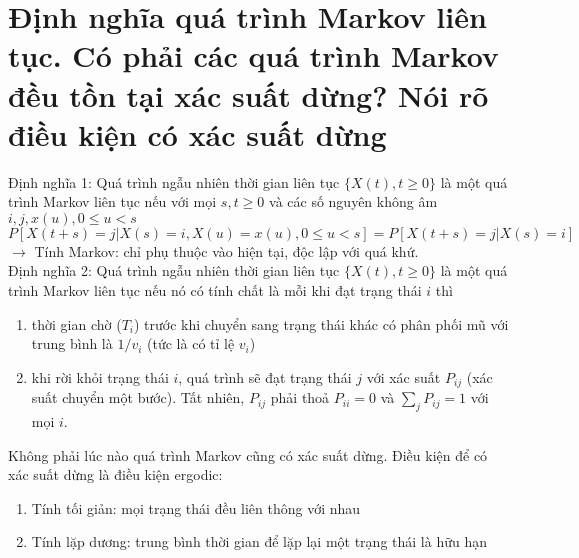 \documentclass{article}
\begin{document}
\section{Định nghĩa quá trình Markov liên tục. Có phải các quá trình Markov đều tồn tại xác suất dừng? Nói rõ điều kiện có xác suất dừng}
Định nghĩa 1: Quá trình ngẫu nhiên thời gian liên tục $\{X(t), t \geq 0\}$ là một quá trình Markov liên tục nếu với mọi $s, t \geq 0$ và các số nguyên không âm $i, j, x(u), 0 \leq u < s$
\[
P[X(t + s) = j | X(s) = i, X(u) = x(u), 0 \leq u < s] = P[X(t + s) = j | X(s) = i]
\]
$\rightarrow$ Tính Markov: chỉ phụ thuộc vào hiện tại, độc lập với quá khứ.\\
Định nghĩa 2: Quá trình ngẫu nhiên thời gian liên tục $\{X(t), t \geq 0\}$ là một quá trình Markov liên tục nếu nó có tính chất là mỗi khi đạt trạng thái $i$ thì
\begin{enumerate}
    \item thời gian chờ ($T_i$) trước khi chuyển sang trạng thái khác có phân phối mũ với trung bình là $1/v_i$ (tức là có tỉ lệ $v_i$)
    \item khi rời khỏi trạng thái $i$, quá trình sẽ đạt trạng thái $j$ với xác suất $P_{ij}$ (xác suất chuyển một bước). Tất nhiên, $P_{ij}$ phải thoả $P_{ii} = 0$ và $\sum_j P_{ij} = 1$ với mọi $i$.
\end{enumerate}
Không phải lúc nào quá trình Markov cũng có xác suất dừng. Điều kiện để có xác suất dừng là điều kiện ergodic:
\begin{enumerate}
    \item Tính tối giản: mọi trạng thái đều liên thông với nhau
    \item Tính lặp dương: trung bình thời gian để lặp lại một trạng thái là hữu hạn
\end{enumerate}
\end{document}
